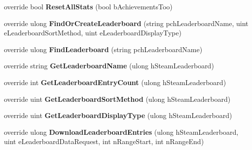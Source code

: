 \begin{DoxyCompactItemize}
override bool {\bfseries Reset\+All\+Stats} (bool b\+Achievements\+Too)
\item 
\mbox{\label{class_valve_1_1_steamworks_1_1_c_steam_user_stats_a43a10df1eb115032bc1a454bf732ed5d}} 
override ulong {\bfseries Find\+Or\+Create\+Leaderboard} (string pch\+Leaderboard\+Name, uint e\+Leaderboard\+Sort\+Method, uint e\+Leaderboard\+Display\+Type)
\item 
\mbox{\label{class_valve_1_1_steamworks_1_1_c_steam_user_stats_a3238c41191aad7c5fae249d524a865f2}} 
override ulong {\bfseries Find\+Leaderboard} (string pch\+Leaderboard\+Name)
\item 
\mbox{\label{class_valve_1_1_steamworks_1_1_c_steam_user_stats_aa58850cb3fc5cfe8d607195822df979c}} 
override string {\bfseries Get\+Leaderboard\+Name} (ulong h\+Steam\+Leaderboard)
\item 
\mbox{\label{class_valve_1_1_steamworks_1_1_c_steam_user_stats_aa383f7b3ff6ec78c16216f877a11b6e3}} 
override int {\bfseries Get\+Leaderboard\+Entry\+Count} (ulong h\+Steam\+Leaderboard)
\item 
\mbox{\label{class_valve_1_1_steamworks_1_1_c_steam_user_stats_ac12a38df6ea6979a66bc0f238728c6e8}} 
override uint {\bfseries Get\+Leaderboard\+Sort\+Method} (ulong h\+Steam\+Leaderboard)
\item 
\mbox{\label{class_valve_1_1_steamworks_1_1_c_steam_user_stats_a0f4b537041692362a511d8cc5fc90f5e}} 
override uint {\bfseries Get\+Leaderboard\+Display\+Type} (ulong h\+Steam\+Leaderboard)
\item 
\mbox{\label{class_valve_1_1_steamworks_1_1_c_steam_user_stats_a3b07fb4c25cad587ea3b83822c29fe1e}} 
override ulong {\bfseries Download\+Leaderboard\+Entries} (ulong h\+Steam\+Leaderboard, uint e\+Leaderboard\+Data\+Request, int n\+Range\+Start, int n\+Range\+End)
\item 
\mbox{\label{class_valve_1_1_steamworks_1_1_c_steam_user_stats_ae0332e759a28fcee3faf19dbd2b9d3d2}} 

\end{DoxyCompactItemize}
